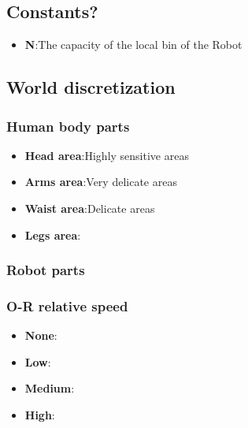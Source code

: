 \documentclass[a4paper]{article}
\begin{document}
\subsection{Constants?}
\begin{itemize}
	\item \textbf{N}:\@ The capacity of the local bin of the Robot
\end{itemize}
\subsection{World discretization}

\subsubsection{Human body parts}
\begin{itemize}
	\item \textbf{Head area}:\@ Highly sensitive areas
	\item \textbf{Arms area}:\@ Very delicate areas
	\item \textbf{Waist area}:\@ Delicate areas
	\item \textbf{Legs area}:\@ 
\end{itemize}

\subsubsection{Robot parts}

\subsubsection{O-R relative speed}
\begin{itemize}
	\item \textbf{None}:\@ 
	\item \textbf{Low}:\@ 
	\item \textbf{Medium}:\@ 
	\item \textbf{High}:\@ 
\end{itemize}
\end{document}
